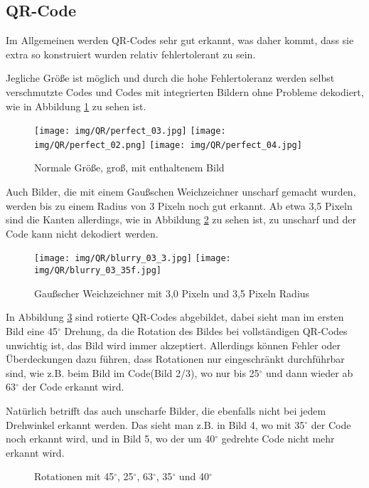 \subsection*{QR-Code}
\writtenby{\dcauthornameriren}%
Im Allgemeinen werden QR-Codes sehr gut erkannt, was daher kommt, dass sie extra so konstruiert wurden relativ fehlertolerant zu sein.

Jegliche Größe ist möglich und durch die hohe Fehlertoleranz werden selbst verschmutzte Codes und Codes mit integrierten Bildern ohne Probleme dekodiert, wie in Abbildung \ref*{fig:qrnormal} zu sehen ist.

\begin{figure}[H]
  \centering
  \texttt{[image: img/QR/perfect\_03.jpg]}
  \texttt{[image: img/QR/perfect\_02.png]}
  \texttt{[image: img/QR/perfect\_04.jpg]}
  \caption{Normale Größe, groß, mit enthaltenem Bild}
  \label{fig:qrnormal}
\end{figure}

Auch Bilder, die mit einem Gaußschen Weichzeichner unscharf gemacht wurden, werden bis zu einem Radius von 3 Pixeln noch gut erkannt. Ab etwa 3,5 Pixeln sind die Kanten allerdings, wie in Abbildung \ref*{fig:qrblur} zu sehen ist, zu unscharf und der Code kann nicht dekodiert werden.
\begin{figure}[H]
  \centering
  \texttt{[image: img/QR/blurry\_03\_3.jpg]}
  \texttt{[image: img/QR/blurry\_03\_35f.jpg]}
  \caption{Gaußscher Weichzeichner mit 3,0 Pixeln und 3,5 Pixeln Radius}
  \label{fig:qrblur}
\end{figure}

In Abbildung \ref*{fig:qrrotate} sind rotierte QR-Codes abgebildet, dabei sieht man im ersten Bild eine 45$ ^\circ $ Drehung, da die Rotation des Bildes bei vollständigen QR-Codes unwichtig ist, das Bild wird immer akzeptiert. Allerdings können Fehler oder Überdeckungen dazu führen, dass Rotationen nur eingeschränkt durchführbar sind, wie z.B. beim Bild im Code(Bild 2/3), wo nur bis 25$^\circ$ und dann wieder ab 63$^\circ$ der Code erkannt wird.

Natürlich betrifft das auch unscharfe Bilder, die ebenfalls nicht bei jedem Drehwinkel erkannt werden. Das sieht man z.B. in Bild 4, wo mit 35$^\circ$ der Code noch erkannt wird, und in Bild 5, wo der um 40$^\circ$ gedrehte Code nicht mehr erkannt wird.
\begin{figure}[H]
  \centering
  \setlength{\fboxrule}{1pt}
  \caption{Rotationen mit 45$^\circ$, 25$^\circ$, 63$^\circ$, 35$^\circ$ und 40$^\circ$}
  \label{fig:qrrotate}
\end{figure}

